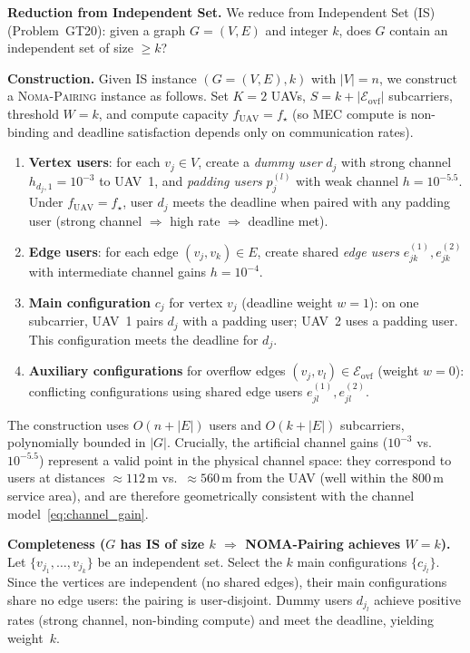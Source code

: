 \documentclass[journal]{IEEEtran}
\begin{document}
\textbf{Reduction from Independent Set.}
We reduce from Independent Set (IS)~\cite{garey1979computers} (Problem~GT20): given a graph $G\!=\!(V,E)$ and integer $k$, does $G$ contain an independent set of size $\geq k$?

\textbf{Construction.}
Given IS instance $(G\!=\!(V,E), k)$ with $|V|\!=\!n$, we construct a \textsc{Noma-Pairing} instance as follows.
Set $K\!=\!2$ UAVs, $S\!=\!k + |\mathcal{E}_{\text{ovf}}|$ subcarriers, threshold $W\!=\!k$, and compute capacity $f_{\text{UAV}}\!=\!f_{\star}$ (so MEC compute is non-binding and deadline satisfaction depends only on communication rates).

\begin{enumerate}
  \item \textbf{Vertex users}: for each $v_j \in V$, create a \emph{dummy user} $d_j$ with strong channel $h_{d_j,1}\!=\!10^{-3}$ to UAV~1, and \emph{padding users} $p_j^{(l)}$ with weak channel $h\!=\!10^{-5.5}$. Under $f_{\text{UAV}}\!=\!f_{\star}$, user $d_j$ meets the deadline when paired with any padding user (strong channel $\Rightarrow$ high rate $\Rightarrow$ deadline met).
  \item \textbf{Edge users}: for each edge $(v_j, v_k) \in E$, create shared \emph{edge users} $e_{jk}^{(1)}, e_{jk}^{(2)}$ with intermediate channel gains $h\!=\!10^{-4}$.
  \item \textbf{Main configuration} $c_j$ for vertex $v_j$ (deadline weight $w\!=\!1$): on one subcarrier, UAV~1 pairs $d_j$ with a padding user; UAV~2 uses a padding user. This configuration meets the deadline for $d_j$.
  \item \textbf{Auxiliary configurations} for overflow edges $(v_j, v_l) \in \mathcal{E}_{\text{ovf}}$ (weight $w\!=\!0$): conflicting configurations using shared edge users $e_{jl}^{(1)}, e_{jl}^{(2)}$.
\end{enumerate}
The construction uses $O(n + |E|)$ users and $O(k + |E|)$ subcarriers, polynomially bounded in $|G|$.
Crucially, the artificial channel gains ($10^{-3}$ vs.\ $10^{-5.5}$) represent a valid point in the physical channel space: they correspond to users at distances $\approx 112$\,m vs.\ $\approx 560$\,m from the UAV (well within the 800\,m service area), and are therefore geometrically consistent with the channel model~\eqref{eq:channel_gain}.

\textbf{Completeness ($G$ has IS of size $k$ $\Rightarrow$ NOMA-Pairing achieves $W\!=\!k$).}
Let $\{v_{j_1}, \ldots, v_{j_k}\}$ be an independent set.
Select the $k$ main configurations $\{c_{j_l}\}$.
Since the vertices are independent (no shared edges), their main configurations share no edge users: the pairing is user-disjoint.
Dummy users $d_{j_l}$ achieve positive rates (strong channel, non-binding compute) and meet the deadline, yielding weight~$k$.
\end{document}
